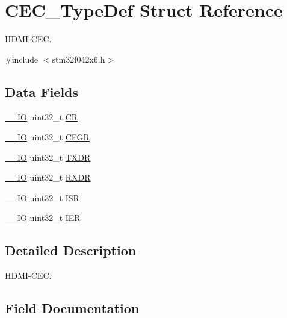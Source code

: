 \hypertarget{struct_c_e_c___type_def}{}\section{C\+E\+C\+\_\+\+Type\+Def Struct Reference}
\label{struct_c_e_c___type_def}


H\+D\+M\+I-\/\+C\+EC.  




{\ttfamily \#include $<$stm32f042x6.\+h$>$}

\subsection*{Data Fields}
\begin{DoxyCompactItemize}
\item 
\hyperlink{core__sc300_8h_aec43007d9998a0a0e01faede4133d6be}{\+\_\+\+\_\+\+IO} uint32\+\_\+t \hyperlink{struct_c_e_c___type_def_ab40c89c59391aaa9d9a8ec011dd0907a}{CR}
\item 
\hyperlink{core__sc300_8h_aec43007d9998a0a0e01faede4133d6be}{\+\_\+\+\_\+\+IO} uint32\+\_\+t \hyperlink{struct_c_e_c___type_def_a26f1e746ccbf9c9f67e7c60e61085ec1}{C\+F\+GR}
\item 
\hyperlink{core__sc300_8h_aec43007d9998a0a0e01faede4133d6be}{\+\_\+\+\_\+\+IO} uint32\+\_\+t \hyperlink{struct_c_e_c___type_def_ad7e8d785fff2acfeb8814e43bda8dd72}{T\+X\+DR}
\item 
\hyperlink{core__sc300_8h_aec43007d9998a0a0e01faede4133d6be}{\+\_\+\+\_\+\+IO} uint32\+\_\+t \hyperlink{struct_c_e_c___type_def_a9bf29a9104cb5569823ab892174f9c8c}{R\+X\+DR}
\item 
\hyperlink{core__sc300_8h_aec43007d9998a0a0e01faede4133d6be}{\+\_\+\+\_\+\+IO} uint32\+\_\+t \hyperlink{struct_c_e_c___type_def_ab3c49a96815fcbee63d95e1e74f20e75}{I\+SR}
\item 
\hyperlink{core__sc300_8h_aec43007d9998a0a0e01faede4133d6be}{\+\_\+\+\_\+\+IO} uint32\+\_\+t \hyperlink{struct_c_e_c___type_def_a6566f8cfbd1d8aa7e8db046aa35e77db}{I\+ER}
\end{DoxyCompactItemize}


\subsection{Detailed Description}
H\+D\+M\+I-\/\+C\+EC. 

\subsection{Field Documentation}
\mbox{\label{struct_c_e_c___type_def_a26f1e746ccbf9c9f67e7c60e61085ec1}} 
